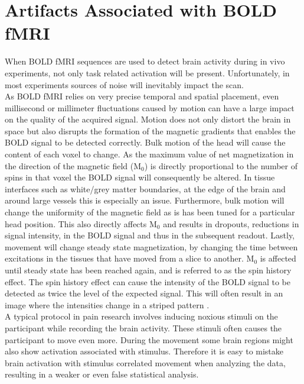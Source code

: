 \section{Artifacts Associated with BOLD fMRI} \label{sec:noise}

When BOLD fMRI sequences are used to detect brain activity during in vivo experiments, not only task related activation will be present. Unfortunately, in most experiments sources of noise will inevitably impact the scan. \cite{Salimi-Khorshidi2014} \\
As BOLD fMRI relies on very precise temporal and spatial placement, even millisecond or millimeter fluctuations caused by motion can have a large impact on the quality of the acquired signal. Motion does not only distort the brain in space but also disrupts the formation of the magnetic gradients that enables the BOLD signal to be detected correctly. Bulk motion of the head will cause the content of each voxel to change. As the maximum value of net magnetization in the direction of the magnetic field (M$_0$) is directly proportional to the number of spins in that voxel the BOLD signal will consequently be altered. In tissue interfaces such as white/grey matter boundaries, at the edge of the brain and around large vessels this is especially an issue. Furthermore, bulk motion will change the uniformity of the magnetic field as is has been tuned for a particular head position. This also directly affects M$_0$ and results in dropouts, reductions in signal intensity, in the BOLD signal and thus in the subsequent readout. Lastly, movement will change steady state magnetization, by changing the time between excitations in the tissues that have moved from a slice to another. M$_0$ is affected until steady state has been reached again, and is referred to as the spin history effect. The spin history effect can cause the intensity of the BOLD signal to be detected as twice the level of the expected signal. \cite{Murphy2013} This will often result in an image where the intensities change in a striped pattern \cite{Poldrack2011}. \\
A typical protocol in pain research involves inducing noxious stimuli on the participant while recording the brain activity. These stimuli often causes the participant to move even more. During the movement some brain regions might also show activation associated with stimulus. Therefore it is easy to mistake brain activation with stimulus correlated movement when analyzing the data, resulting in a weaker or even false statistical analysis. \cite{Poldrack2011} \\
